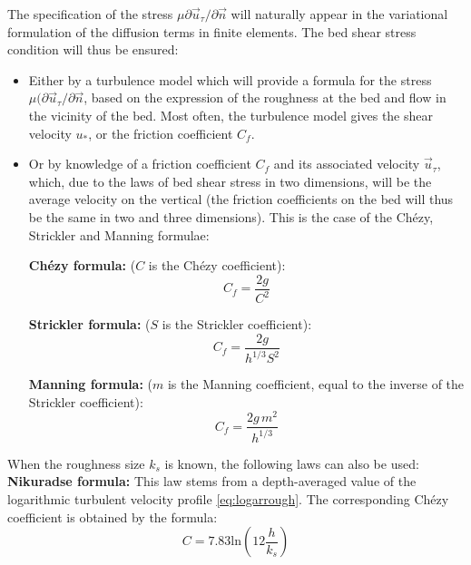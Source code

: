 The specification of the stress $\mu\partial\vec{u}_\tau / \partial \vec{n}$ will naturally appear in
the variational formulation of the diffusion terms in finite elements.
The bed shear stress condition will thus be ensured:
\begin{itemize}
\item Either by a turbulence model which will provide a formula for the stress
  $\mu (\partial\vec{u}_\tau / \partial \vec{n}$, based on the expression of
  the roughness at the bed and flow in the vicinity of the bed. Most
  often, the turbulence model gives the shear velocity $u_{\ast}$, or the
  friction coefficient $C_{f}$.

\item Or by knowledge of a friction coefficient $C_{f}$ and its associated
  velocity $\vec{u}_\tau$, which, due to the laws of bed shear stress
  in two dimensions, will be the average velocity on the vertical (the friction
  coefficients on the bed will thus be the same in two and three dimensions).
  This is the case of the Ch\'{e}zy, Strickler and Manning formulae:

  \textbf{Ch\'{e}zy formula:}%
  ($C$ is the Ch\'{e}zy coefficient):%
  \begin{equation}
    C_{f}=\dfrac{2g}{C^{2}}%
  \end{equation}

  \textbf{Strickler formula:}%
  ($S$ is the Strickler coefficient):%
  \begin{equation}
    C_{f}=\dfrac{2g}{h^{1/3}S^{2}}%
  \end{equation}

  \textbf{Manning formula:}%
  ($m$ is the Manning coefficient, equal to the inverse of the Strickler coefficient):%
  \begin{equation}
    C_{f}=\dfrac{2g\,m^{2}}{h^{1/3}}%
  \end{equation}
\end{itemize}
When the roughness size $k_{s}$ is known, the following laws can also be used:\\

\textbf{Nikuradse formula:}%
This law stems from a depth-averaged value of the logarithmic turbulent velocity profile \eqref{eq:logarrough}.
The corresponding Chézy coefficient is obtained by the formula:%
\begin{equation}
  C=7.83\text{ln}\left(12\dfrac{h}{k_s}\right)
\end{equation}

